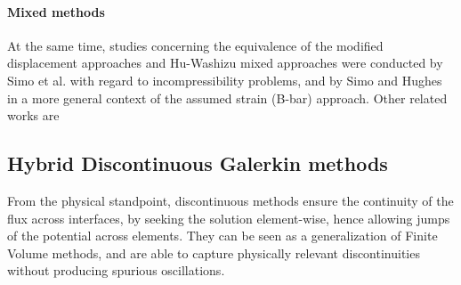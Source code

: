 
\paragraph{Mixed methods}

At the same time,
studies concerning the equivalence of the modified displacement approaches and Hu-Washizu
mixed approaches were conducted by Simo et al. \cite{simo_variational_1985} with regard to incompressibility
problems, and by Simo and Hughes \cite{simo_variational_1985} in a more general context of the assumed strain
(B-bar) approach. Other related works are \cite{hughes_equivalence_1977,oden_observations_1975, shimodaira_equivalence_1985}

\subsection{Hybrid Discontinuous Galerkin methods}

From the physical standpoint, discontinuous methods ensure the continuity of the flux
across interfaces, by seeking the solution element-wise, hence allowing
jumps of the potential across elements. They can be seen as a
generalization of Finite Volume methods, and are able to capture
physically relevant discontinuities without producing spurious
oscillations.

